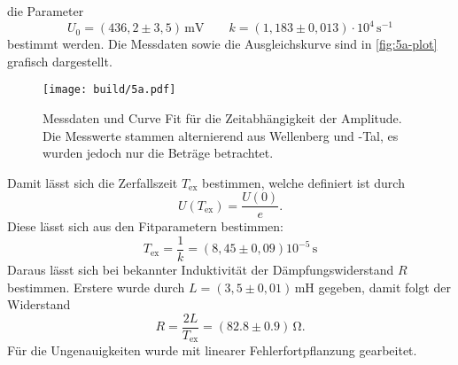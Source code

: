 die Parameter
\begin{equation}
	U_0 = (436,2 \pm 3,5) \, \si{\milli\volt}
	\qquad
	k = (1,183 \pm 0,013) \cdot 10^4 \, \si{\second^{-1}}
\end{equation}
bestimmt werden. Die Messdaten sowie die Ausgleichskurve sind in \autoref{fig:5a-plot}
grafisch dargestellt.
\begin{figure}[H]
	\centering
	\texttt{[image: build/5a.pdf]}
	\caption{Messdaten und Curve Fit für die Zeitabhängigkeit der Amplitude. Die
		Messwerte stammen alternierend aus Wellenberg und -Tal, es wurden jedoch
	nur die Beträge betrachtet.}
	\label{fig:5a-plot}
\end{figure}
Damit lässt sich die Zerfallszeit $T_\text{ex}$ bestimmen, welche definiert ist durch
\begin{equation}
	U\left( T_\text{ex} \right) = \frac{U(0)}{e}.
\end{equation}
Diese lässt sich aus den Fitparametern bestimmen:
\begin{equation}
	T_\text{ex} = \frac{1}{k} = (8,45 \pm 0,09)10^{-5} \, \si{\second}
\end{equation}
Daraus lässt sich bei bekannter Induktivität der Dämpfungswiderstand $R$ bestimmen.
Erstere wurde durch $L = (3,5 \pm 0,01) \, \si{\milli\henry}$ gegeben, damit folgt der
Widerstand
\begin{equation}
	R = \frac{2L}{T_\text{ex}} = (82.8 \pm 0.9) \, \si{\ohm}.
\end{equation}
Für die Ungenauigkeiten wurde mit linearer Fehlerfortpflanzung gearbeitet.

